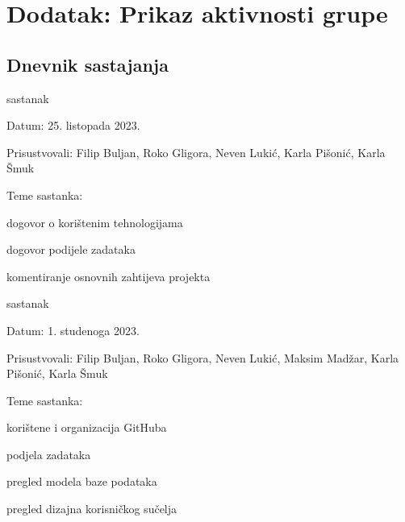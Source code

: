 \chapter*{Dodatak: Prikaz aktivnosti grupe}
		
		\section*{Dnevnik sastajanja}
		
		\begin{packed_enum}
			\item  sastanak
			
			\item[] \begin{packed_item}
				\item Datum: 25. listopada 2023.
				\item Prisustvovali: Filip Buljan, Roko Gligora, Neven Lukić, Karla Pišonić, Karla Šmuk
				\item Teme sastanka:
				\begin{packed_item}
					\item  dogovor o korištenim tehnologijama
					\item  dogovor podijele zadataka
					\item  komentiranje osnovnih zahtijeva projekta
				\end{packed_item}
			\end{packed_item}
			
			\item  sastanak
			\item[] \begin{packed_item}
				\item Datum: 1. studenoga 2023.
				\item Prisustvovali: Filip Buljan, Roko Gligora, Neven Lukić, Maksim Madžar, Karla Pišonić, Karla Šmuk
				\item Teme sastanka:
				\begin{packed_item}
					\item  korištene i organizacija GitHuba
					\item  podjela zadataka
					\item  pregled modela baze podataka
					\item  pregled dizajna korisničkog sučelja
				\end{packed_item}
			\end{packed_item}
		

\end{packed_enum}
